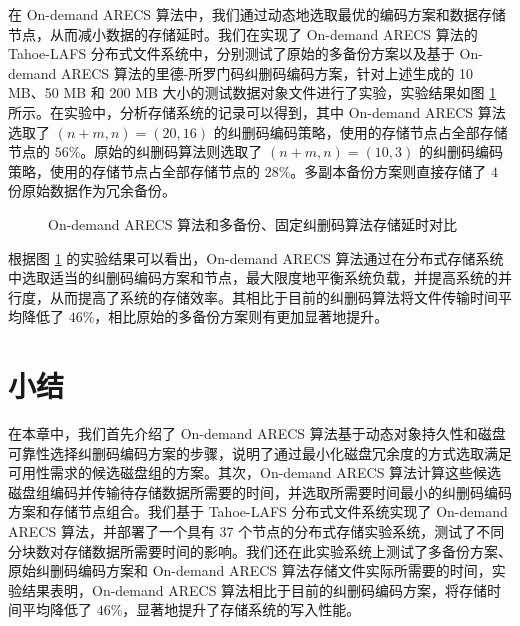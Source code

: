 在 On-demand ARECS 算法中，我们通过动态地选取最优的编码方案和数据存储节点，从而减小数据的存储延时。我们在实现了 On-demand ARECS 算法的 Tahoe-LAFS 分布式文件系统中，分别测试了原始的多备份方案以及基于 On-demand ARECS 算法的里德-所罗门码纠删码编码方案，针对上述生成的 10 MB、50 MB 和 200 MB 大小的测试数据对象文件进行了实验，实验结果如图 \ref{p8} 所示。在实验中，分析存储系统的记录可以得到，其中 On-demand ARECS 算法选取了 $(n+m,n)=(20,16)$ 的纠删码编码策略，使用的存储节点占全部存储节点的 $56\%$。原始的纠删码算法则选取了 $(n+m,n)=(10,3)$ 的纠删码编码策略，使用的存储节点占全部存储节点的 $28\%$。多副本备份方案则直接存储了 $4$ 份原始数据作为冗余备份。

\begin{figure}[!htb]
\centering
\resizebox{.8\textwidth}{!}{}
\caption{On-demand ARECS 算法和多备份、固定纠删码算法存储延时对比}
\label{p8}
\end{figure}

根据图 \ref{p8} 的实验结果可以看出，On-demand ARECS 算法通过在分布式存储系统中选取适当的纠删码编码方案和节点，最大限度地平衡系统负载，并提高系统的并行度，从而提高了系统的存储效率。其相比于目前的纠删码算法将文件传输时间平均降低了 $46\%$，相比原始的多备份方案则有更加显著地提升。
\section{小结}
在本章中，我们首先介绍了 On-demand ARECS 算法基于动态对象持久性和磁盘可靠性选择纠删码编码方案的步骤，说明了通过最小化磁盘冗余度的方式选取满足可用性需求的候选磁盘组的方案。其次，On-demand ARECS 算法计算这些候选磁盘组编码并传输待存储数据所需要的时间，并选取所需要时间最小的纠删码编码方案和存储节点组合。我们基于 Tahoe-LAFS 分布式文件系统实现了 On-demand ARECS 算法，并部署了一个具有 37 个节点的分布式存储实验系统，测试了不同分块数对存储数据所需要时间的影响。我们还在此实验系统上测试了多备份方案、原始纠删码编码方案和 On-demand ARECS 算法存储文件实际所需要的时间，实验结果表明，On-demand ARECS 算法相比于目前的纠删码编码方案，将存储时间平均降低了 $46\%$，显著地提升了存储系统的写入性能。
